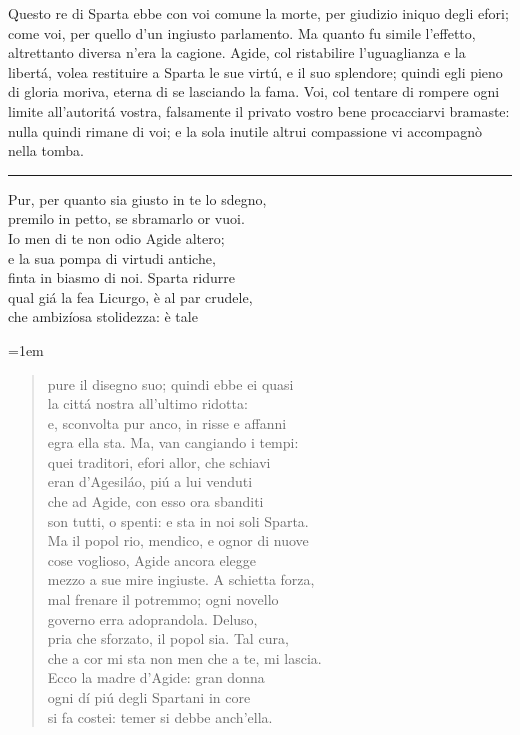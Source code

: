 \documentclass[a5paper,11pt]{book}
\def\testodicontrollo{%
Questo re di Sparta ebbe con voi comune la morte, per giudizio
iniquo degli efori; come voi, per quello d'un ingiusto parlamento.
Ma quanto fu simile l'effetto, altrettanto diversa n'era la
cagione. Agide, col ristabilire l'uguaglianza e la libertá, volea
restituire a Sparta le sue virtú, e il suo splendore; quindi egli
pieno di gloria moriva, eterna di se lasciando la fama. Voi, col
tentare di rompere ogni limite all'autoritá vostra, falsamente il
privato vostro bene procacciarvi bramaste: nulla quindi rimane di
voi; e la sola inutile altrui compassione vi accompagnò nella
tomba.
}
\begin{document}
\testodicontrollo

\noindent\rule{\leftmargini}{1pt}

\begin{versedrama}
  Pur, per quanto sia giusto in te lo sdegno,\\
  premilo in petto, se sbramarlo or vuoi.\\
  Io men di te non odio Agide altero;\\
  e la sua pompa di virtudi antiche,\\
  finta in biasmo di noi. Sparta ridurre\\
  qual giá la fea Licurgo, è al par crudele,\\
  che ambizíosa stolidezza: è tale\\
\end{versedrama}

\leftmargini=1em

\begin{verse}
  pure il disegno suo; quindi ebbe ei quasi\\
  la cittá nostra all'ultimo ridotta:\\
  e, sconvolta pur anco, in risse e affanni\\
  egra ella sta. Ma, van cangiando i tempi:\\
  quei traditori, efori allor, che schiavi\\
  eran d'Agesiláo, piú a lui venduti\\
  che ad Agide, con esso ora sbanditi\\
  son tutti, o spenti: e sta in noi soli Sparta.\\
  Ma il popol rio, mendico, e ognor di nuove\\
  cose voglioso, Agide ancora elegge\\
  mezzo a sue mire ingiuste. A schietta forza,\\
  mal frenare il potremmo; ogni novello\\
  governo erra adoprandola. Deluso,\\
  pria che sforzato, il popol sia. Tal cura,\\
  che a cor mi sta non men che a te, mi lascia.\\
  Ecco la madre d'Agide: gran donna\\
  ogni dí piú degli Spartani in core\\
  si fa costei: temer si debbe anch'ella.\\
\end{verse}
\end{document}

